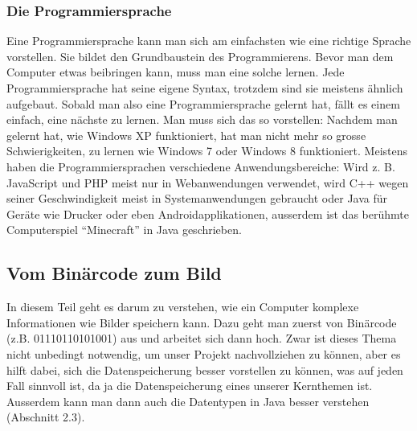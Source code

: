 \subsubsection{Die Programmiersprache}
Eine Programmiersprache kann man sich am einfachsten wie eine richtige Sprache vorstellen. Sie bildet den Grundbaustein des Programmierens. Bevor man dem Computer etwas  beibringen kann, muss man eine solche lernen. Jede Programmiersprache hat seine eigene Syntax, trotzdem sind sie meistens ähnlich aufgebaut. Sobald man also eine Programmiersprache gelernt hat, fällt es einem einfach, eine nächste zu lernen. Man muss sich das so vorstellen: Nachdem man gelernt hat, wie Windows XP funktioniert, hat man nicht mehr so grosse Schwierigkeiten, zu lernen wie Windows 7 oder Windows 8 funktioniert. Meistens haben die Programmiersprachen verschiedene Anwendungsbereiche: Wird z. B. JavaScript und PHP meist nur in Webanwendungen verwendet, wird C++ wegen seiner Geschwindigkeit meist in Systemanwendungen gebraucht oder Java für Geräte wie Drucker oder eben Androidapplikationen, ausserdem ist das berühmte Computerspiel "`Minecraft"' in Java geschrieben.
\subsection{Vom Binärcode zum Bild}
In diesem Teil geht es darum zu verstehen, wie ein Computer komplexe Informationen wie Bilder speichern kann. Dazu geht man zuerst von Binärcode (z.B. 01110110101001) aus und arbeitet sich dann hoch. Zwar ist dieses Thema nicht unbedingt notwendig, um unser Projekt nachvollziehen zu können, aber es hilft dabei, sich die Datenspeicherung besser vorstellen zu können, was auf jeden Fall sinnvoll ist, da ja die Datenspeicherung eines unserer Kernthemen ist. Ausserdem kann man dann auch die Datentypen in Java besser verstehen (Abschnitt 2.3).
